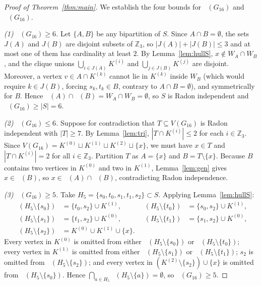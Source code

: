 \documentclass[11pt,a4paper]{article}
\DeclareMathOperator{\hl}{hl_{cc}}
\DeclareMathOperator{\rd}{rd_{cc}}
\DeclareMathOperator{\Hull}{Hull_{cc}}
\begin{document}
\begin{proof}[Proof of Theorem~\ref{thm:main}]
We establish the four bounds for $\rd(G_{16})$ and $\hl(G_{16})$.

\emph{(1) $\rd(G_{16}) \ge 6$.} Let $\{A, B\}$ be any bipartition of $S$. Since $A \cap B = \emptyset$, the sets $J(A)$ and $J(B)$ are disjoint subsets of $\mathbb{Z}_3$, so $|J(A)| + |J(B)| \le 3$ and at most one of them has cardinality at least $2$. By Lemma~\ref{lem:hullS}, $x \notin W_A \cap W_B$, and the clique unions $\bigcup_{i \in J(A)} K^{(i)}$ and $\bigcup_{j \in J(B)} K^{(j)}$ are disjoint. Moreover, a vertex $v \in A \cap K^{(k)}$ cannot lie in $K^{(k)}$ inside $W_B$ (which would require $k \in J(B)$, forcing $s_k, t_k \in B$, contrary to $A \cap B = \emptyset$), and symmetrically for $B$. Hence $\Hull(A) \cap \Hull(B) = W_A \cap W_B = \emptyset$, so $S$ is Radon independent and $\rd(G_{16}) \ge |S| = 6$.

\emph{(2) $\rd(G_{16}) \le 6$.} Suppose for contradiction that $T \subseteq V(G_{16})$ is Radon independent with $|T| \ge 7$. By Lemma~\ref{lem:tri}, $|T \cap K^{(i)}| \le 2$ for each $i \in \mathbb{Z}_3$. Since $V(G_{16}) = K^{(0)} \sqcup K^{(1)} \sqcup K^{(2)} \sqcup \{x\}$, we must have $x \in T$ and $|T \cap K^{(i)}| = 2$ for all $i \in \mathbb{Z}_3$. Partition $T$ as $A = \{x\}$ and $B = T \setminus \{x\}$. Because $B$ contains two vertices in $K^{(0)}$ and two in $K^{(1)}$, Lemma~\ref{lem:gen} gives $x \in \Hull(B)$, so $x \in \Hull(A) \cap \Hull(B)$, contradicting Radon independence.

\emph{(3) $\hl(G_{16}) \ge 5$.} Take $H_5 = \{s_0, t_0, s_1, t_1, s_2\} \subset S$. Applying Lemma~\ref{lem:hullS}:
\begin{align*}
\Hull(H_5 \setminus \{s_0\}) &= \{t_0, s_2\} \cup K^{(1)}, &
\Hull(H_5 \setminus \{t_0\}) &= \{s_0, s_2\} \cup K^{(1)}, \\
\Hull(H_5 \setminus \{s_1\}) &= \{t_1, s_2\} \cup K^{(0)}, &
\Hull(H_5 \setminus \{t_1\}) &= \{s_1, s_2\} \cup K^{(0)}, \\
\Hull(H_5 \setminus \{s_2\}) &= K^{(0)} \cup K^{(1)} \cup \{x\}.
\end{align*}
Every vertex in $K^{(0)}$ is omitted from either $\Hull(H_5 \setminus \{s_0\})$ or $\Hull(H_5 \setminus \{t_0\})$; every vertex in $K^{(1)}$ is omitted from either $\Hull(H_5 \setminus \{s_1\})$ or $\Hull(H_5 \setminus \{t_1\})$; $s_2$ is omitted from $\Hull(H_5 \setminus \{s_2\})$; and every vertex in $(K^{(2)} \setminus \{s_2\}) \cup \{x\}$ is omitted from $\Hull(H_5 \setminus \{s_0\})$. Hence $\bigcap_{a \in H_5} \Hull(H_5 \setminus \{a\}) = \emptyset$, so $\hl(G_{16}) \ge 5$.


\end{proof}
\end{document}
